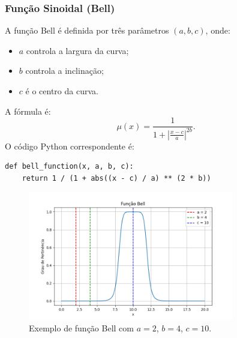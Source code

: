 \documentclass[a4paper,12pt]{article}
\begin{document}
\subsubsection{Função Sinoidal (Bell)}
A função Bell é definida por três parâmetros $(a, b, c)$, onde:
\begin{itemize}
    \item $a$ controla a largura da curva;
    \item $b$ controla a inclinação;
    \item $c$ é o centro da curva.
\end{itemize}
A fórmula é:
\[
\mu(x) = \frac{1}{1 + \left|\frac{x - c}{a}\right|^{2b}}.
\]
O código Python correspondente é:
\begin{verbatim}
def bell_function(x, a, b, c):
    return 1 / (1 + abs((x - c) / a) ** (2 * b))
\end{verbatim}
\begin{figure}[H]
    \centering
    \includegraphics[width=0.8\textwidth]{img/bell.png}
    \caption{Exemplo de função Bell com $a=2$, $b=4$, $c=10$.}
\end{figure}
\end{document}
